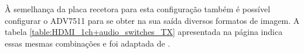 À semelhança da placa recetora para esta configuração também é possível configurar o ADV7511 para se obter na sua saída diversos formatos de imagem. A tabela \ref{table:HDMI_1ch+audio_switches_TX} apresentada na página \pageref{table:HDMI_1ch+audio_switches_TX} indica essas mesmas combinações e foi adaptada de \cite{R014}. 

